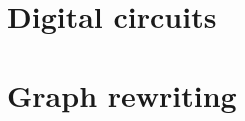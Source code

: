 \documentclass[a4paper, oneside, 12pt, openany]{book}
\numberwithin{equation}{section}
\numberwithin{table}{section}
\begin{document}
\frontmatter


\restoregeometry%




\setcounter{tocdepth}{2}
\tableofcontents

\mainmatter%

\part{Digital circuits}






\part{Graph rewriting}







\backmatter%
\printbibliography[heading=bibintoc]%
\printnomenclature%
\printindex
\end{document}
